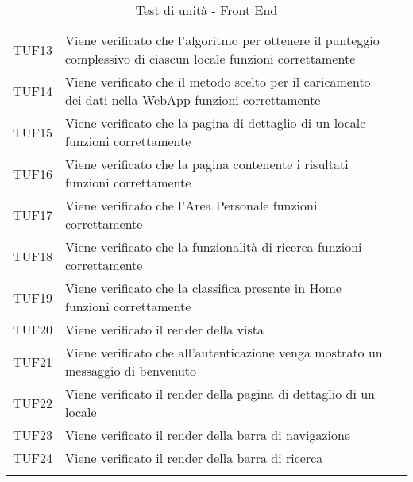 \begin{longtable}{ m{}<{\centering}  m{}<{\centering}  m{}<{\centering} }
	TUF13 & Viene verificato che l'algoritmo per ottenere il punteggio complessivo di ciascun locale funzioni correttamente & \Su \\
	TUF14 & Viene verificato che il metodo scelto per il caricamento dei dati nella WebApp funzioni correttamente & \Su \\
	TUF15 & Viene verificato che la pagina di dettaglio di un locale funzioni correttamente & \Su \\
	TUF16 & Viene verificato che la pagina contenente i risultati funzioni correttamente & \Su \\
	TUF17 & Viene verificato che l'Area Personale funzioni correttamente & \Su \\
	TUF18 & Viene verificato che la funzionalità di ricerca funzioni correttamente & \Su \\
	TUF19 & Viene verificato che la classifica presente in Home funzioni correttamente & \Su \\
	TUF20 & Viene verificato il render della vista & \Su \\
	TUF21 & Viene verificato che all'autenticazione venga mostrato un messaggio di benvenuto & \Su \\
	TUF22 & Viene verificato il render della pagina di dettaglio di un locale & \Su \\
	TUF23 & Viene verificato il render della barra di navigazione & \Su \\
	TUF24 & Viene verificato il render della barra di ricerca & \Su \\
    \caption{Test di unità - Front End}
\end{longtable}	

%
%	 
%	
%
